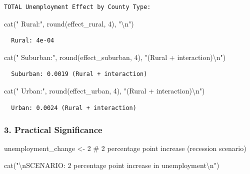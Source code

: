\documentclass[
  11pt,
]{article}
\newenvironment{Shaded}{\begin{snugshade}}{\end{snugshade}}
\newcommand{\CommentTok}[1]{\textcolor[rgb]{0.37,0.37,0.37}{#1}}
\newcommand{\DecValTok}[1]{\textcolor[rgb]{0.68,0.00,0.00}{#1}}
\newcommand{\FunctionTok}[1]{\textcolor[rgb]{0.28,0.35,0.67}{#1}}
\newcommand{\NormalTok}[1]{\textcolor[rgb]{0.00,0.23,0.31}{#1}}
\newcommand{\OtherTok}[1]{\textcolor[rgb]{0.00,0.23,0.31}{#1}}
\newcommand{\SpecialCharTok}[1]{\textcolor[rgb]{0.37,0.37,0.37}{#1}}
\newcommand{\StringTok}[1]{\textcolor[rgb]{0.13,0.47,0.30}{#1}}
\begin{document}
\begin{verbatim}
TOTAL Unemployment Effect by County Type:
\end{verbatim}

\begin{Shaded}
\begin{Highlighting}[]
\FunctionTok{cat}\NormalTok{(}\StringTok{"  Rural:"}\NormalTok{, }\FunctionTok{round}\NormalTok{(effect\_rural, }\DecValTok{4}\NormalTok{), }\StringTok{"}\SpecialCharTok{\textbackslash{}n}\StringTok{"}\NormalTok{)}
\end{Highlighting}
\end{Shaded}

\begin{verbatim}
  Rural: 4e-04 
\end{verbatim}

\begin{Shaded}
\begin{Highlighting}[]
\FunctionTok{cat}\NormalTok{(}\StringTok{"  Suburban:"}\NormalTok{, }\FunctionTok{round}\NormalTok{(effect\_suburban, }\DecValTok{4}\NormalTok{), }\StringTok{"(Rural + interaction)}\SpecialCharTok{\textbackslash{}n}\StringTok{"}\NormalTok{)}
\end{Highlighting}
\end{Shaded}

\begin{verbatim}
  Suburban: 0.0019 (Rural + interaction)
\end{verbatim}

\begin{Shaded}
\begin{Highlighting}[]
\FunctionTok{cat}\NormalTok{(}\StringTok{"  Urban:"}\NormalTok{, }\FunctionTok{round}\NormalTok{(effect\_urban, }\DecValTok{4}\NormalTok{), }\StringTok{"(Rural + interaction)}\SpecialCharTok{\textbackslash{}n}\StringTok{"}\NormalTok{)}
\end{Highlighting}
\end{Shaded}

\begin{verbatim}
  Urban: 0.0024 (Rural + interaction)
\end{verbatim}

\subsubsection{3. Practical Significance}\label{practical-significance}

\begin{Shaded}
\begin{Highlighting}[]
\NormalTok{unemployment\_change }\OtherTok{\textless{}{-}} \DecValTok{2}  \CommentTok{\# 2 percentage point increase (recession scenario)}

\FunctionTok{cat}\NormalTok{(}\StringTok{"}\SpecialCharTok{\textbackslash{}n}\StringTok{SCENARIO: 2 percentage point increase in unemployment}\SpecialCharTok{\textbackslash{}n}\StringTok{"}\NormalTok{)}
\end{Highlighting}
\end{Shaded}
\end{document}
